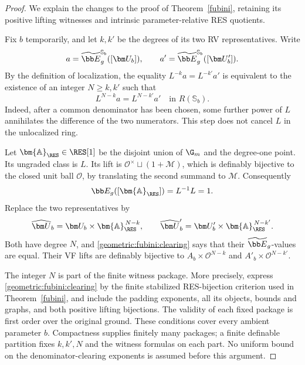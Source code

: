 \begin{proof}
We explain the changes to the proof of Theorem~\ref{fubini}, retaining its
positive lifting witnesses and intrinsic parameter-relative RES quotients.

Fix $b$ temporarily, and let $k,k'$ be the degrees of its two RV
representatives. Write
\[
 a=\widetilde{\bb E}_g^{\mathbb S_b}([\bm U_b]),\qquad
 a'=\widetilde{\bb E}_g^{\mathbb S_b}([\bm U'_b]).
\]
By the definition of localization, the equality $L^{-k}a=L^{-k'}a'$
is equivalent to the existence of an integer $N\geq k,k'$ such that
\begin{equation}\label{geometric:fubini:clearing}
 L^{N-k}a=L^{N-k'}a'\quad\text{in }R(\mathbb S_b).
\end{equation}
Indeed, after a common denominator has been chosen, some further power
of $L$ annihilates the difference of the two numerators. This step does
not cancel $L$ in the unlocalized ring.

Let $\bm{\mathbb A}_{\RES}\in\RES[1]$ be the disjoint union of
$\G_m$ and the degree-one point. Its ungraded class is $L$.
Its lift is $\mathcal O^\times\sqcup(1+\mathcal M)$, which is definably
bijective to the closed unit ball $\mathcal O$, by translating the second
summand to $\mathcal M$. Consequently
\[
 \bb E_g([\bm{\mathbb A}_{\RES}])=L^{-1}L=1.
\]
Replace the two representatives by
\[
 \widehat{\bm U}_b=\bm U_b\times\bm{\mathbb A}_{\RES}^{\,N-k},
 \qquad
 \widehat{\bm U}'_b=\bm U'_b\times\bm{\mathbb A}_{\RES}^{\,N-k'}.
\]
Both have degree $N$, and \eqref{geometric:fubini:clearing} says that their $\widetilde{\bb E}_g$-values
are equal. Their VF lifts are definably bijective to
$A_b\times\mathcal O^{N-k}$ and $A'_b\times\mathcal O^{N-k'}$.

The integer $N$ is part of the finite witness package. More precisely,
express \eqref{geometric:fubini:clearing} by the finite stabilized RES-bijection criterion
used in Theorem~\ref{fubini}, and include the padding exponents, all its objects,
bounds and graphs, and both positive lifting bijections. The validity of
each fixed package is first order over the original ground. These
conditions cover every ambient parameter $b$. Compactness supplies
finitely many packages; a finite definable partition fixes $k,k',N$ and
the witness formulas on each part. No uniform bound on the
denominator-clearing exponents is assumed before this argument.


\end{proof}
